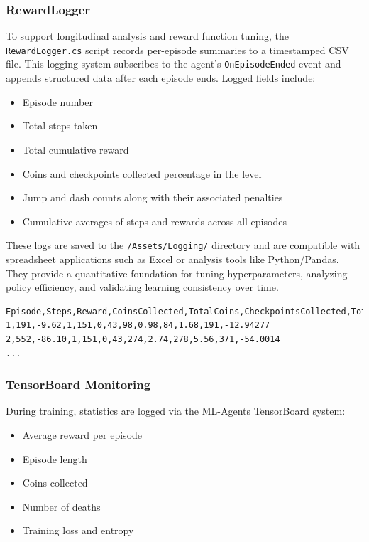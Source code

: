\documentclass[12pt,oneside,openright,a4paper]{cpe-english-project}
\begin{document}
\subsubsection{RewardLogger}

To support longitudinal analysis and reward function tuning, the \texttt{RewardLogger.cs} script records per-episode summaries to a timestamped CSV file. This logging system subscribes to the agent’s \texttt{OnEpisodeEnded} event and appends structured data after each episode ends. Logged fields include:

\begin{itemize}
\item Episode number
\item Total steps taken
\item Total cumulative reward
\item Coins and checkpoints collected percentage in the level
\item Jump and dash counts along with their associated penalties
\item Cumulative averages of steps and rewards across all episodes
\end{itemize}

These logs are saved to the \texttt{/Assets/Logging/} directory and are compatible with spreadsheet applications such as Excel or analysis tools like Python/Pandas. They provide a quantitative foundation for tuning hyperparameters, analyzing policy efficiency, and validating learning consistency over time.

\begin{lstlisting}
Episode,Steps,Reward,CoinsCollected,TotalCoins,CheckpointsCollected,TotalCheckpoints,JumpCount,JumpPenalty,DashCount,DashPenalty,CumulativeAvgSteps,CumulativeAvgRewards
1,191,-9.62,1,151,0,43,98,0.98,84,1.68,191,-12.94277
2,552,-86.10,1,151,0,43,274,2.74,278,5.56,371,-54.0014
...
\end{lstlisting}

\subsubsection{TensorBoard Monitoring}

During training, statistics are logged via the ML-Agents TensorBoard system:

\begin{itemize}
\item Average reward per episode
\item Episode length
\item Coins collected
\item Number of deaths
\item Training loss and entropy
\end{itemize}
\end{document}
